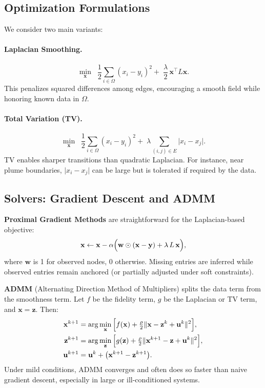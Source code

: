 \documentclass[12pt]{article}                                %
\begin{document}
\subsection{Optimization Formulations}  %
We consider two main variants:

\paragraph{Laplacian Smoothing.}  %
\[
\min_{\mathbf{x}} \;\;\frac{1}{2}\sum_{i\in \Omega} (x_i - y_i)^2 
+\;\frac{\lambda}{2}\,\mathbf{x}^\top L \mathbf{x}.
\]
This penalizes squared differences among edges, encouraging a smooth field while honoring 
known data in $\Omega$.

\paragraph{Total Variation (TV).}  %
\[
\min_{\mathbf{x}} \;\;\frac{1}{2}\sum_{i\in\Omega}(x_i - y_i)^2 
+\;\lambda \sum_{(i,j)\in E} \bigl|x_i - x_j\bigr|.
\]
TV enables sharper transitions than quadratic Laplacian. For instance, near plume boundaries, 
$\lvert x_i - x_j\rvert$ can be large but is tolerated if required by the data.

\subsection{Solvers: Gradient Descent and ADMM}   %
\textbf{Proximal Gradient Methods} are straightforward for the Laplacian-based objective:
\[
\mathbf{x} \leftarrow \mathbf{x} - \alpha\Bigl(\mathbf{w}\odot (\mathbf{x} - \mathbf{y}) 
+ \lambda\,L\,\mathbf{x}\Bigr),
\]
where $\mathbf{w}$ is 1 for observed nodes, 0 otherwise. Missing entries are inferred while 
observed entries remain anchored (or partially adjusted under soft constraints).

\textbf{ADMM} (Alternating Direction Method of Multipliers) splits the data term from the 
smoothness term. Let $f$ be the fidelity term, $g$ be the Laplacian or TV term, and $\mathbf{x} 
= \mathbf{z}$. Then:
\[
\begin{aligned}
\mathbf{x}^{k+1} &= \arg\min_\mathbf{x}\,\Bigl[f(\mathbf{x}) + \tfrac{\rho}{2}\|\mathbf{x}-\mathbf{z}^k 
+ \mathbf{u}^k\|^2\Bigr],\\
\mathbf{z}^{k+1} &= \arg\min_\mathbf{z}\,\Bigl[g(\mathbf{z}) + \tfrac{\rho}{2}\|\mathbf{x}^{k+1}-\mathbf{z}
+\mathbf{u}^k\|^2\Bigr],\\
\mathbf{u}^{k+1} &= \mathbf{u}^k + \bigl(\mathbf{x}^{k+1} - \mathbf{z}^{k+1}\bigr).
\end{aligned}
\]
Under mild conditions, ADMM converges \cite{BoydADMM} and often does so faster than naive 
gradient descent, especially in large or ill-conditioned systems.
\end{document}
